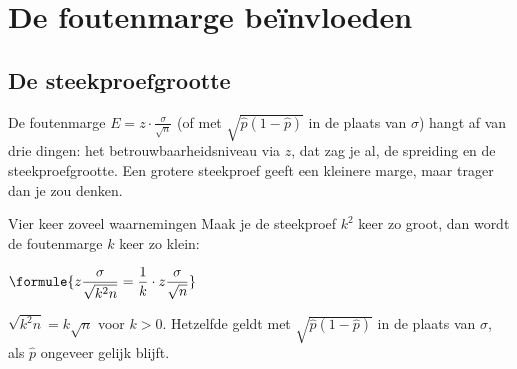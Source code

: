 
\begin{oefeningen}
\end{oefeningen}

\section{De foutenmarge beïnvloeden}

\subsection{De steekproefgrootte}

De foutenmarge $E = z \cdot \frac{\sigma}{\sqrt n}$ (of met $\sqrt{\hat{p}(1 - \hat{p})}$ in de plaats van $\sigma$) hangt af van drie dingen: het betrouwbaarheidsniveau via $z$, dat zag je al, de spreiding en de steekproefgrootte. Een grotere steekproef geeft een kleinere marge, maar trager dan je zou denken.

\begin{theorie}
\begin{stelling}{Vier keer zoveel waarnemingen}
Maak je de steekproef $k^2$ keer zo groot, dan wordt de foutenmarge $k$ keer zo klein:

\vspace{1mm}
\qquad $\formule{z \dfrac{\sigma}{\sqrt{k^2 n}} = \dfrac{1}{k} \cdot z \dfrac{\sigma}{\sqrt{n}}}$
\end{stelling}

\begin{bewijs}
$\sqrt{k^2 n} = k\sqrt{n}$ voor $k > 0$. Hetzelfde geldt met $\sqrt{\hat{p}(1 - \hat{p})}$ in de plaats van $\sigma$, als $\hat{p}$ ongeveer gelijk blijft.
\end{bewijs}
\end{theorie}

